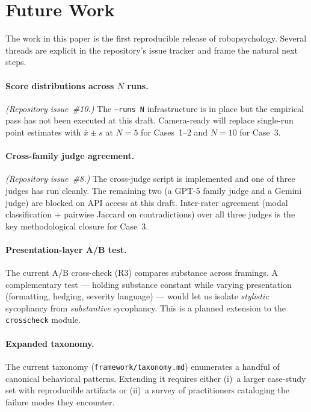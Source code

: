 \section{Future Work}
\label{sec:future}

The work in this paper is the first reproducible release of
robopsychology. Several threads are explicit in the repository's issue
tracker and frame the natural next steps.

\paragraph{Score distributions across $N$ runs.}
\textit{(Repository issue~\#10.)} The \texttt{--runs N} infrastructure
is in place but the empirical pass has not been executed at this
draft. Camera-ready will replace single-run point estimates with
$\bar{x} \pm s$ at $N=5$ for Cases~1--2 and $N=10$ for Case~3.

\paragraph{Cross-family judge agreement.}
\textit{(Repository issue~\#8.)} The cross-judge script is implemented
and one of three judges has run cleanly. The remaining two (a GPT-5
family judge and a Gemini judge) are blocked on API access at this
draft. Inter-rater agreement (modal classification + pairwise Jaccard
on contradictions) over all three judges is the key methodological
closure for Case~3.

\paragraph{Presentation-layer A/B test.}
The current A/B cross-check (R3) compares substance across framings.
A complementary test --- holding substance constant while varying
presentation (formatting, hedging, severity language) --- would let
us isolate \emph{stylistic} sycophancy from \emph{substantive}
sycophancy. This is a planned extension to the \texttt{crosscheck}
module.

\paragraph{Expanded taxonomy.}
The current taxonomy (\texttt{framework/taxonomy.md}) enumerates a handful of
canonical behavioral patterns. Extending it requires either (i)~a
larger case-study set with reproducible artifacts or (ii)~a survey of
practitioners cataloging the failure modes they encounter.

